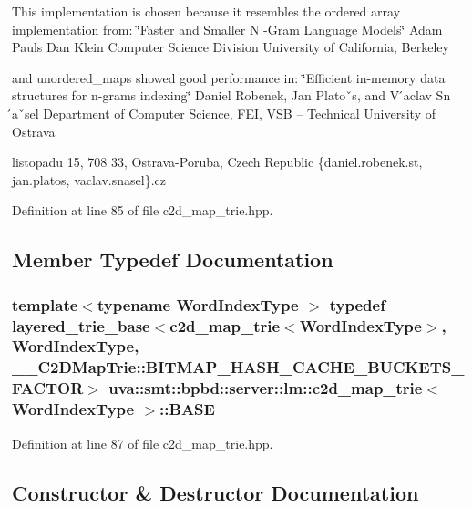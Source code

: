This implementation is chosen because it resembles the ordered array implementation from\+: \char`\"{}\+Faster and Smaller N -\/\+Gram Language Models\char`\"{} Adam Pauls Dan Klein Computer Science Division University of California, Berkeley

and unordered\+\_\+maps showed good performance in\+: \char`\"{}\+Efficient in-\/memory data structures for n-\/grams indexing\char`\"{} Daniel Robenek, Jan Platoˇs, and V ́aclav Sn ́aˇsel Department of Computer Science, F\+E\+I, V\+S\+B – Technical University of Ostrava
\begin{DoxyEnumerate}
\item listopadu 15, 708 33, Ostrava-\/\+Poruba, Czech Republic \{daniel.\+robenek.\+st, jan.\+platos, vaclav.\+snasel\}.cz 
\end{DoxyEnumerate}

Definition at line 85 of file c2d\+\_\+map\+\_\+trie.\+hpp.



\subsection{Member Typedef Documentation}
\hypertarget{classuva_1_1smt_1_1bpbd_1_1server_1_1lm_1_1c2d__map__trie_aed8a7e183010a24bd3dfa02661fb58ca}{}
\subsubsection[{B\+A\+S\+E}]{\setlength{\rightskip}{0pt plus 5cm}template$<$typename Word\+Index\+Type $>$ typedef {\bf layered\+\_\+trie\+\_\+base}$<${\bf c2d\+\_\+map\+\_\+trie}$<${\bf Word\+Index\+Type}$>$, {\bf Word\+Index\+Type}, \+\_\+\+\_\+\+C2\+D\+Map\+Trie\+::\+B\+I\+T\+M\+A\+P\+\_\+\+H\+A\+S\+H\+\_\+\+C\+A\+C\+H\+E\+\_\+\+B\+U\+C\+K\+E\+T\+S\+\_\+\+F\+A\+C\+T\+O\+R$>$ {\bf uva\+::smt\+::bpbd\+::server\+::lm\+::c2d\+\_\+map\+\_\+trie}$<$ {\bf Word\+Index\+Type} $>$\+::{\bf B\+A\+S\+E}}\label{classuva_1_1smt_1_1bpbd_1_1server_1_1lm_1_1c2d__map__trie_aed8a7e183010a24bd3dfa02661fb58ca}


Definition at line 87 of file c2d\+\_\+map\+\_\+trie.\+hpp.



\subsection{Constructor \& Destructor Documentation}
\hypertarget{classuva_1_1smt_1_1bpbd_1_1server_1_1lm_1_1c2d__map__trie_ad3bc6f164ab7cc95f92b4d260ab43b7d}{}
